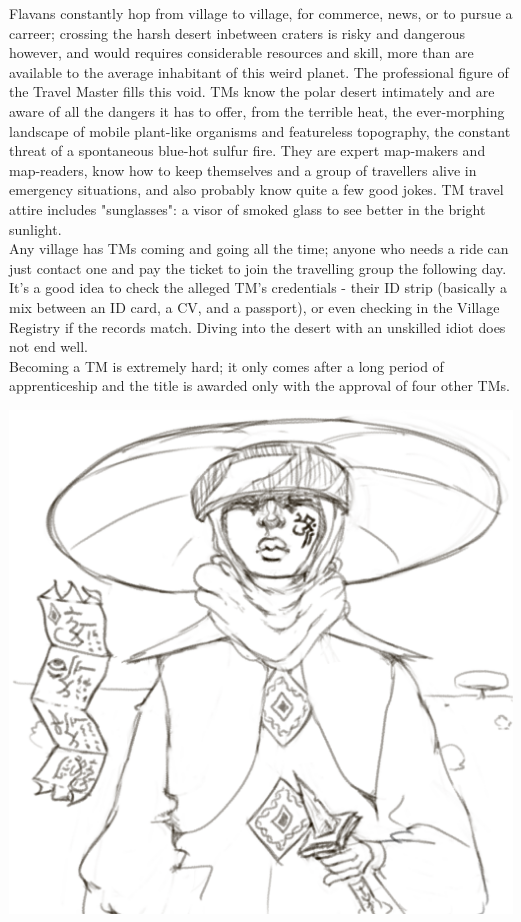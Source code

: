 \documentclass[10pt,oneside]{memoir}
\begin{document}
\begin{minipage}{0.6\textwidth}
Flavans constantly hop from village to village, for commerce, news, or to pursue a carreer; crossing the harsh desert inbetween craters is risky and dangerous however, and would requires considerable resources and skill, more than are available to the average inhabitant of this weird planet. The professional figure of the Travel Master fills this void. TMs know the polar desert intimately and are aware of all the dangers it has to offer, from the terrible heat, the ever-morphing landscape of mobile plant-like organisms and featureless topography, the constant threat of a spontaneous blue-hot sulfur fire. They are expert map-makers and map-readers, know how to keep themselves and a group of travellers alive in emergency situations, and also probably know quite a few good jokes. TM travel attire includes "sunglasses": a visor of smoked glass to see better in the bright sunlight.\\

Any village has TMs coming and going all the time; anyone who needs a ride can just contact one and pay the ticket to join the travelling group the following day. It's a good idea to check the alleged TM's credentials - their ID strip (basically a mix between an ID card, a CV, and a passport), or even checking in the Village Registry if the records match. Diving into the desert with an unskilled idiot does not end well.\\

Becoming a TM is extremely hard; it only comes after a long period of apprenticeship and the title is awarded only with the approval of four other TMs.
\end{minipage}
\hfill
\begin{minipage}{0.4\textwidth}
    \begin{center}
        \includegraphics[scale=0.6]{../drawings/travelmaster.png}
    \end{center}
\end{minipage}
\end{document}
